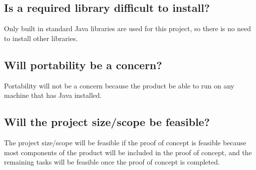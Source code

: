 \documentclass[11pt]{article}
\begin{document}
    \subsection*{Is a required library difficult to install?}
    Only built in standard Java libraries are used for this project, so there is no need to install other libraries. 

    \subsection*{Will portability be a concern?}
    Portability will not be a concern because the product be able to run on any machine that has Java installed. 
    \subsection*{Will the project size/scope be
              feasible?}
	The project size/scope will be feasible if the proof of concept is feasible because most components of the product will be included in the proof of concept, and the remaining tasks will be feasible once the proof of concept is completed. 
  
\end{document}
